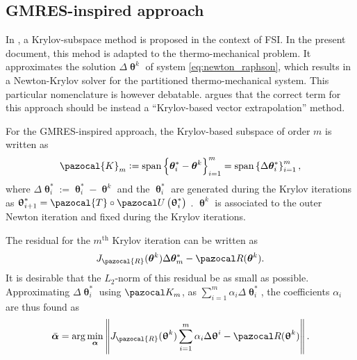 \subsection{GMRES-inspired approach}

In \cite{michler_interface_2005}, a Krylov-subspace method is proposed in the context of FSI.
In the present document, this mehod is adapted to the thermo-mechanical problem.
It approximates the solution $\Delta \bm{\uptheta}^{k}$ of system \eqref{eq:newton_raphson}, which results in a Newton-Krylov solver for the partitioned thermo-mechanical system.
This particular nomenclature is however debatable.
\cite{kuttler_vector_2009} argues that the correct term for this approach should be instead a “Krylov-based vector extrapolation” method. 


For the GMRES-inspired approach, the Krylov-based subspace of order $m$ is written as
\begin{equation}
\pazocal{K}_{m}:=\operatorname{span}\left\{\boldsymbol{\theta}^{*}_i-\boldsymbol{\theta}^{k}\right\}_{i=1}^{m}=\operatorname{span}\left\{\Delta \boldsymbol{\theta}^*_{i}\right\}_{i=1}^{m},
\end{equation}
where $\Delta \bm{\uptheta}^*_{i}:=\bm{\uptheta}^*_{i}-\bm{\uptheta}^{k}$ and the $\bm{\uptheta}^*_{i}$ are generated during the Krylov iterations as $\bm{\uptheta}^*_{i+1}=\pazocal{T} \circ \pazocal U\left(\bm{\uptheta}^*_{i}\right)$ . $\bm{\uptheta}^{k}$ is associated to the outer Newton iteration and fixed during the Krylov iterations.

The residual for the $m^\mathrm{th}$ Krylov iteration can be written as
\begin{equation}
J_\pazocal{R}(\boldsymbol \theta^k)\Delta\boldsymbol \theta^*_m - \pazocal R(\boldsymbol \theta^k).
\end{equation}
It is desirable that the $L_2$-norm of this residual be as small as possible.
Approximating $\Delta \bm \uptheta^*_i$ using $\pazocal K_m$, as $\sum_{i=1}^m \alpha_i \Delta \bm \uptheta^*_i$, the coefficients $\alpha_i$ are thus found as
\begin{equation} \label{eq:gmres_1st_ls}
\bar{\boldsymbol \alpha} = \arg\min_{\boldsymbol\alpha} \left\|J_\pazocal{R}(\bm \uptheta^k)\sum_{i=1}^m \alpha_i \Delta\bm \uptheta^i - \pazocal R(\bm \uptheta^k)\right\|.
\end{equation}

